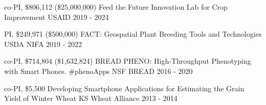 \begin{cvgrants}

  \cvgrant
    {co-PI, \$806,112 (\$25,000,000)} 
    {Feed the Future Innovation Lab for Crop Improvement}
    {USAID} %
    {2019 - 2024} %
    {
    }

  \cvgrant
    {PI, \$249,971 (\$500,000)} %
    {FACT: Geospatial Plant Breeding Tools and Technologies} %
    {USDA NIFA} %
    {2019 - 2022} %
    {
    }

  \cvgrant
    {co-PI, \$714,804 (\$1,632,824)} %
    {BREAD PHENO: High-Throughput Phenotyping with Smart Phones. \#phenoApps} %
    {NSF BREAD} %
    {2016 - 2020} %
    {
    }

  \cvgrant
    {co-PI, \$5,500} %
    {Developing Smartphone Applications for Estimating the Grain Yield of Winter Wheat} %
    {KS Wheat Alliance} %
    {2013 - 2014} %
    {
    }

\end{cvgrants}